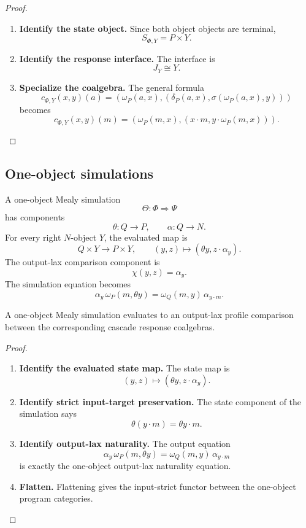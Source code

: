 \begin{proof}
\leavevmode
\begin{enumerate}
\item \textbf{Identify the state object.}
Since both object objects are terminal,
\[
S_{\Phi,Y}=P\times Y.
\]

\item \textbf{Identify the response interface.}
The interface is
\[
J_Y\cong Y.
\]

\item \textbf{Specialize the coalgebra.}
The general formula
\[
c_{\Phi,Y}(x,y)(a)
=
\left(
\omega_P(a,x),
\left(
\delta_P(a,x),
\sigma(\omega_P(a,x),y)
\right)
\right)
\]
becomes
\[
c_{\Phi,Y}(x,y)(m)
=
\left(
\omega_P(m,x),
\left(
x\cdot m,
y\cdot\omega_P(m,x)
\right)
\right).
\]
\end{enumerate}
\end{proof}

\subsection{One-object simulations}
\label{subsec:poly-relative-one-object-simulations}

A one-object Mealy simulation
\[
\Theta:\Phi\Rightarrow\Psi
\]
has components
\[
\theta:Q\to P,
\qquad
\alpha:Q\to N.
\]
For every right \(N\)-object \(Y\), the evaluated map is
\[
Q\times Y\to P\times Y,
\qquad
(y,z)\longmapsto(\theta y,z\cdot\alpha_y).
\]
The output-lax comparison component is
\[
\chi(y,z)=\alpha_y.
\]
The simulation equation becomes
\[
\alpha_y\,\omega_P(m,\theta y)
=
\omega_Q(m,y)\,\alpha_{y\cdot m}.
\]

\begin{proposition}
\label{prop:poly-relative-one-object-output-lax}
A one-object Mealy simulation evaluates to an output-lax profile comparison
between the corresponding cascade response coalgebras.
\end{proposition}

\begin{proof}
\leavevmode
\begin{enumerate}
\item \textbf{Identify the evaluated state map.}
The state map is
\[
(y,z)\mapsto(\theta y,z\cdot\alpha_y).
\]

\item \textbf{Identify strict input-target preservation.}
The state component of the simulation says
\[
\theta(y\cdot m)=\theta y\cdot m.
\]

\item \textbf{Identify output-lax naturality.}
The output equation
\[
\alpha_y\,\omega_P(m,\theta y)
=
\omega_Q(m,y)\,\alpha_{y\cdot m}
\]
is exactly the one-object output-lax naturality equation.

\item \textbf{Flatten.}
Flattening gives the input-strict functor between the one-object program
categories.
\end{enumerate}
\end{proof}

